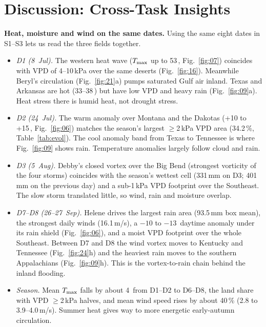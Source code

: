 \section{Discussion: Cross-Task Insights}
\label{sec:discussion}
\textbf{Heat, moisture and wind on the same dates.} Using the same eight dates in S1--S3 lets us read the three fields
together.
\begin{itemize}
\item \emph{D1 (8~Jul).} The western heat wave ($T_{\max}$ up to 53\,\degC, Fig.~\ref{fig:07}) coincides with VPD of
  4--10\,kPa over the same deserts (Fig.~\ref{fig:16}). Meanwhile Beryl's circulation (Fig.~\ref{fig:21}a) pumps saturated
  Gulf air inland. Texas and Arkansas are hot (33--38\,\degC) but have low VPD and heavy rain (Fig.~\ref{fig:09}a). Heat
  stress there is humid heat, not drought stress.
\item \emph{D2 (24~Jul).} The warm anomaly over Montana and the Dakotas (+10 to +15\,\degC, Fig.~\ref{fig:06}) matches the
  season's largest $\ge$2\,kPa VPD area (34.2\,\%, Table~\ref{tab:evol}). The cool anomaly band from Texas to Tennessee is
  where Fig.~\ref{fig:09} shows rain. Temperature anomalies largely follow cloud and rain.
\item \emph{D3 (5~Aug).} Debby's closed vortex over the Big Bend (strongest vorticity of the four storms) coincides with
  the season's wettest cell (331\,mm on D3; 401\,mm on the previous day) and a sub-1\,kPa VPD footprint over the Southeast.
  The slow storm translated little, so wind, rain and moisture overlap.
\item \emph{D7--D8 (26--27~Sep).} Helene drives the largest rain area (93.5\,mm box mean), the strongest daily winds
  (16.1\,m/s), a $-10$ to $-13$\,\degC{} daytime anomaly under its rain shield (Fig.~\ref{fig:06}), and a moist VPD
  footprint over the whole Southeast. Between D7 and D8 the wind vortex moves to Kentucky and Tennessee (Fig.~\ref{fig:24}h)
  and the heaviest rain moves to the southern Appalachians (Fig.~\ref{fig:09}h). This is the vortex-to-rain chain behind
  the inland flooding.
\item \emph{Season.} Mean $T_{\max}$ falls by about 4\,\degC{} from D1--D2 to D6--D8, the land share with VPD $\ge$2\,kPa halves,
  and mean wind speed rises by about 40\,\% (2.8 to 3.9--4.0\,m/s). Summer heat gives way to more energetic early-autumn
  circulation.
\end{itemize}

